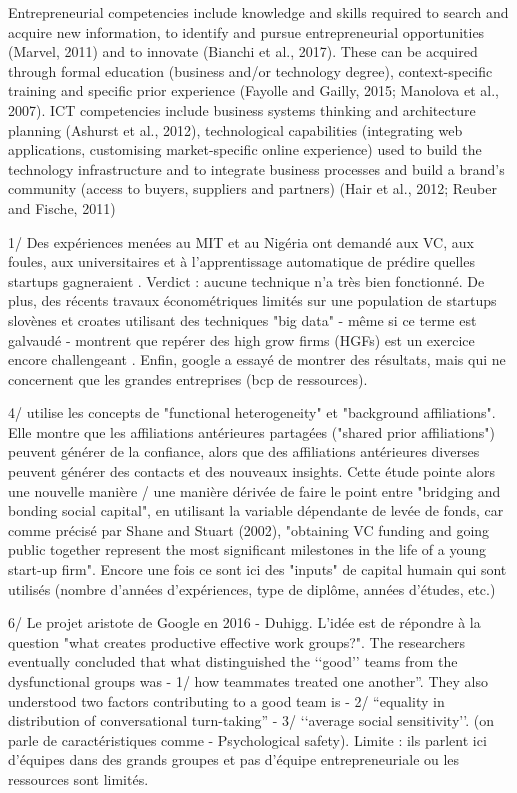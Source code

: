 \documentclass[12pt]{article}
\begin{document}
Entrepreneurial competencies include knowledge and skills required to search and acquire new information, to identify and pursue entrepreneurial opportunities (Marvel, 2011) and to innovate (Bianchi et al., 2017). These can be acquired through formal education (business and/or technology degree), context-specific training and specific prior experience (Fayolle and Gailly, 2015; Manolova et al., 2007). ICT competencies include business systems thinking and architecture planning (Ashurst et al., 2012), technological capabilities (integrating web applications, customising market-specific online experience) used to build the technology infrastructure and to integrate business processes and build a brand’s community (access to buyers, suppliers and partners) (Hair et al., 2012; Reuber and Fische, 2011)

1/ Des expériences menées au MIT et au Nigéria ont demandé aux VC, aux foules, aux universitaires et à l'apprentissage automatique de prédire quelles startups gagneraient \citep{ghassemiautomated}. Verdict : aucune technique n'a très bien fonctionné. De plus, des récents travaux économétriques limités sur une population de startups slovènes et croates utilisant des techniques "big data" - même si ce terme est galvaudé - montrent que repérer des high grow firms (HGFs) est un exercice encore challengeant \citep{coad2020catching}. Enfin, google a essayé de montrer des résultats, mais qui ne concernent que les grandes entreprises (bcp de ressources).

4/ \citep{beckman2007early} utilise les concepts de "functional heterogeneity" et "background affiliations". Elle montre que les affiliations antérieures partagées ("shared prior affiliations") peuvent générer de la confiance, alors que des affiliations antérieures diverses peuvent générer des contacts et des nouveaux insights. Cette étude pointe alors une nouvelle manière / une manière dérivée de faire le point entre "bridging and bonding social capital", en utilisant la variable dépendante de levée de fonds, car comme précisé par Shane and Stuart (2002), "obtaining VC funding and going public together represent the most significant milestones in the life of a young start-up firm". Encore une fois ce sont ici des "inputs" de capital humain qui sont utilisés (nombre d'années d'expériences, type de diplôme, années d'études, etc.)

6/ Le projet aristote de Google en 2016 - Duhigg. L'idée est de répondre à la question "what creates productive effective work groups?". The researchers eventually concluded that what distinguished the ‘‘good’’ teams from the dysfunctional groups was -	1/ how teammates treated one another”. They also understood two factors contributing to a good team is -	2/ “equality in distribution of conversational turn-taking” -	3/ ‘‘average social sensitivity’’. (on parle de caractéristiques comme -	Psychological safety). Limite : ils parlent ici d'équipes dans des grands groupes et pas d'équipe entrepreneuriale ou les ressources sont limités.
\end{document}
